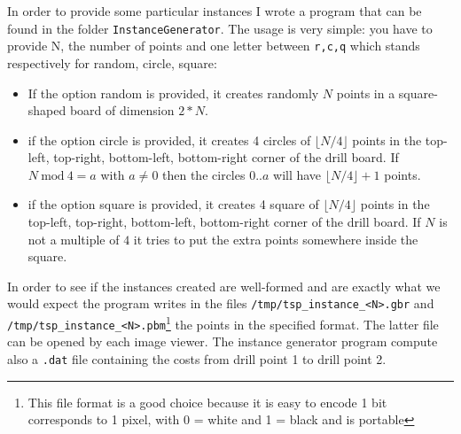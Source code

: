 In order to provide some particular instances I wrote a program that can be found in the folder
\verb|InstanceGenerator|. The usage is very simple: you have to provide N, the number of points and
one letter between \verb|r,c,q| which stands respectively for random, circle, square:
\begin{itemize}
	\item If the option random is provided, it creates randomly $N$ points in a square-shaped board of dimension $2*N$.
	\item if the option circle is provided, it creates 4 circles of $\lfloor{N/4}\rfloor$ points in the top-left, top-right, bottom-left, bottom-right corner
	of the drill board. If $N\ \text{mod} \ 4 = a$ with $a \neq 0$ then the circles $0..a$ will have $\lfloor{N/4}\rfloor + 1$ points.
	\item if the option square is provided, it creates 4 square of $\lfloor{N/4}\rfloor$ points in the top-left, top-right, bottom-left,
	bottom-right corner of the drill board. If $N$ is not a multiple of $4$ it tries to put the extra points somewhere inside the square.
\end{itemize}
In order to see if the instances created are well-formed and are exactly what we would expect the program writes in the files
\verb!/tmp/tsp_instance_<N>.gbr! and \verb!/tmp/tsp_instance_<N>.pbm!\footnote{This file format is a good choice because it is easy to encode 1 bit corresponds to 1 pixel, with 0 = white and 1 = black and is portable}  the points in the specified format.
The latter file can be opened by each image viewer.
The instance generator program compute also a \verb|.dat| file containing the costs from drill point 1 to drill point 2.